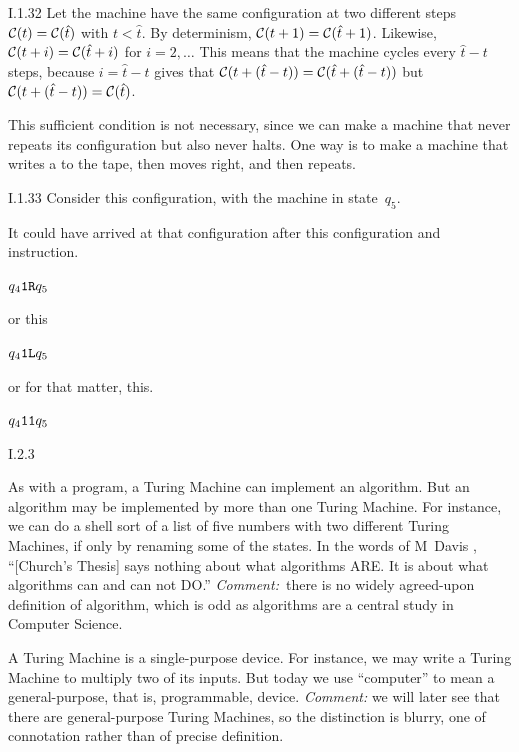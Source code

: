 %
\begin{ans}{I.1.32}
Let the machine have the same configuration at two different steps
$\mathcal{C}(t)=\mathcal{C}(\hat{t})$ with $t< \hat{t}$.
By determinism, $\mathcal{C}(t+1)=\mathcal{C}(\hat{t}+1)$.
Likewise, $\mathcal{C}(t+i)=\mathcal{C}(\hat{t}+i)$ for
$i=2,\ldots $\@
This means that the machine cycles every $\hat{t}-t$ steps, because
$i=\hat{t}-t$ gives that
$\mathcal{C}(t+(\hat{t}-t))=\mathcal{C}(\hat{t}+(\hat{t}-t))$
but $\mathcal{C}(t+(\hat{t}-t))=\mathcal{C}(\hat{t})$.

This sufficient condition is not necessary, since we can make a machine
that never repeats its configuration but also never halts.
One way is to make a machine that writes a  to the tape, then
moves right, and then repeats.
\end{ans}
%
\begin{ans}{I.1.33}
Consider this configuration, with the machine in state~$q_5$.
\begin{display}
\end{display}
It could have arrived at that configuration after this configuration and
instruction.
\begin{display}
  \qquad
  $q_{4}\texttt{1}\texttt{R}q_{5}$
\end{display}
or this
\begin{display}
  \qquad
  $q_{4}\texttt{1}\texttt{L}q_{5}$
\end{display}
or for that matter, this.
\begin{display}
  \qquad
  $q_{4}\texttt{1}\texttt{1}q_{5}$
\end{display}
\end{ans}
%
%
\begin{ans}{I.2.3}
\begin{exparts}
\item As with a program, a Turing Machine can implement an algorithm.
But an algorithm may be implemented by more than one Turing Machine.
For instance, we can do a shell sort of a list of five numbers
with two different Turing Machines, if only by renaming some of the states.
In the words of M~Davis \autocite{Davis16}, ``[Church's Thesis] says
nothing about what algorithms ARE.
It is about what algorithms can and can not DO.''
\textit{Comment:}~there is no widely agreed-upon definition of algorithm,
which is odd as algorithms are a central study in Computer Science.
\item A Turing Machine is a single-purpose device.
For instance, we may write a Turing Machine to multiply two of its inputs.
But today we use ``computer'' to mean a general-purpose, that is, programmable,
device.
\textit{Comment:} we will later see that there are general-purpose
Turing Machines, so the distinction is blurry, one of connotation rather
than of precise definition.
\end{exparts}
\end{ans}
